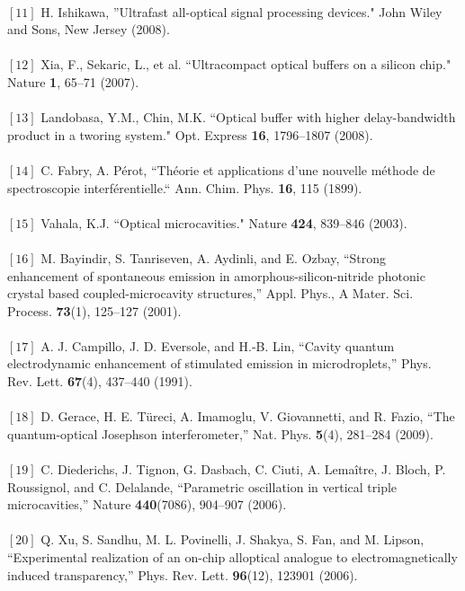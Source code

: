 {\\$[11]$ H. Ishikawa, ”Ultrafast all-optical signal processing devices." John Wiley and Sons, New Jersey (2008). \\
\\$[12]$ Xia, F., Sekaric, L., et al. “Ultracompact optical buffers on a silicon chip." Nature \textbf{1}, 65–71
(2007).\\
\\$[13]$ Landobasa, Y.M., Chin, M.K. “Optical buffer with higher delay-bandwidth product in a tworing system." Opt. Express \textbf{16}, 1796–1807 (2008).\\
\\$[14]$ C. Fabry, A. Pérot, “Théorie et applications d’une nouvelle méthode de spectroscopie interférentielle.“ Ann. Chim. Phys. \textbf{16}, 115 (1899).\\
\\$[15]$ Vahala, K.J. “Optical microcavities." Nature \textbf{424}, 839–846 (2003).\\
\\$[16]$ M. Bayindir, S. Tanriseven, A. Aydinli, and E. Ozbay, “Strong enhancement of spontaneous emission in
amorphous-silicon-nitride photonic crystal based coupled-microcavity structures,” Appl. Phys., A Mater. Sci.
Process. \textbf{73}(1), 125–127 (2001).\\
\\$[17]$ A. J. Campillo, J. D. Eversole, and H.-B. Lin, “Cavity quantum electrodynamic enhancement of stimulated
emission in microdroplets,” Phys. Rev. Lett. \textbf{67}(4), 437–440 (1991).\\
\\$[18]$ D. Gerace, H. E. Türeci, A. Imamoglu, V. Giovannetti, and R. Fazio, “The quantum-optical Josephson
interferometer,” Nat. Phys. \textbf{5}(4), 281–284 (2009).\\
\\$[19]$  C. Diederichs, J. Tignon, G. Dasbach, C. Ciuti, A. Lemaître, J. Bloch, P. Roussignol, and C. Delalande,
“Parametric oscillation in vertical triple microcavities,” Nature \textbf{440}(7086), 904–907 (2006).\\
\\$[20]$ Q. Xu, S. Sandhu, M. L. Povinelli, J. Shakya, S. Fan, and M. Lipson, “Experimental realization of an on-chip alloptical analogue to electromagnetically induced transparency,” Phys. Rev. Lett. \textbf{96}(12), 123901 (2006).}